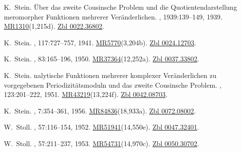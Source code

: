 \documentclass[11pt,a4paper, final, twoside]{article}
\numberwithin{equation}{section}
\begin{document}
\begin{appendices}
\begin{thebibliography}{100}
K.~Stein.
\newblock \"{U}ber das zweite {C}ousinsche {P}roblem und die
  {Q}uotientendarstellung meromorpher {F}unktionen mehrerer {V}er\"anderlichen.
,
  1939:139--149, 1939.
\newblock \href{http://www.ams.org/mathscinet-getitem?mr=1310}{MR1310}(1,215d).
  \href{http://zbmath.org/?q=an:0022.36802}{Zbl 0022.36802}.

K.~Stein.
, 117:727--757, 1941.
\newblock \href{http://www.ams.org/mathscinet-getitem?mr=5770}{MR5770}(3,204b).
  \href{http://zbmath.org/?q=an:0024.12703}{Zbl 0024.12703}.

K.~Stein.
, 83:165--196, 1950.
\newblock
  \href{http://www.ams.org/mathscinet-getitem?mr=37364}{MR37364}(12,252a).
  \href{http://zbmath.org/?q=an:0037.33802}{Zbl 0037.33802}.

K.~Stein.
nalytische {F}unktionen mehrerer komplexer {V}er\"anderlichen zu
  vorgegebenen {P}eriodizit\"atsmoduln und das zweite {C}ousinsche {P}roblem.
, 123:201--222, 1951.
\newblock
  \href{http://www.ams.org/mathscinet-getitem?mr=43219}{MR43219}(13,224f).
  \href{http://zbmath.org/?q=an:0042.08703}{Zbl 0042.08703}.

K.~Stein.
, 7:354--361, 1956.
\newblock
  \href{http://www.ams.org/mathscinet-getitem?mr=84836}{MR84836}(18,933a).
  \href{http://zbmath.org/?q=an:0072.08002}{Zbl 0072.08002}.

W.~Stoll.
, 57:116--154, 1952.
\newblock
  \href{http://www.ams.org/mathscinet-getitem?mr=51941}{MR51941}(14,550e).
  \href{http://zbmath.org/?q=an:0047.32401}{Zbl 0047.32401}.

W.~Stoll.
, 57:211--237, 1953.
\newblock
  \href{http://www.ams.org/mathscinet-getitem?mr=54731}{MR54731}(14,970c).
  \href{http://zbmath.org/?q=an:0050.30702}{Zbl 0050.30702}.


\end{thebibliography}
\end{appendices}
\end{document}
